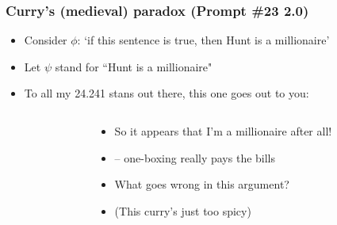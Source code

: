 \begin{frame}
\frametitle{Curry's (medieval) paradox (Prompt \#23 2.0)}

\begin{itemize}[<+->]

\item Consider $\phi$: `if this sentence is true, then Hunt is a millionaire'

\item Let $\psi$ stand for ``Hunt is a millionaire"

\item To all my 24.241 stans out there, this one goes out to you:
\vspace{-1em}
\end{itemize}
\pause
 \begin{columns}
    \begin{column}{.5\textwidth}
\footnotesize
\begin{fitchproof}
  \open
  \pause
  \pause
  \pause
 \close
  \pause
  \pause
  \pause 
\end{fitchproof}
    \end{column}

  \begin{column}{.6\textwidth}

\begin{itemize}[<+->]

\item So it appears that I'm a millionaire after all! 

\item[] -- one-boxing really pays the bills

\bigskip

\item What goes wrong in this argument?

\item[] (This curry's just too spicy)


\end{itemize}
 \end{column}
 \end{columns}

\end{frame}

